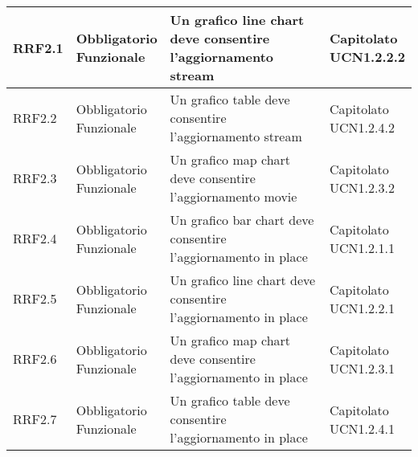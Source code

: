 \begin{longtabu}[c]{|X[0.7,l]|X[l]|X[2.5,l]|X[l]|}
                RRF2.1 & 
                \parbox[t]{4cm}{ Obbligatorio \\ Funzionale} & Un grafico line chart deve consentire l'aggiornamento stream & \parbox[t]{4cm}{Capitolato \\ UCN1.2.2.2 }  \\ 
                \hline
                
                RRF2.2 & 
                \parbox[t]{4cm}{ Obbligatorio \\ Funzionale} & Un grafico table deve consentire l'aggiornamento stream & \parbox[t]{4cm}{Capitolato \\ UCN1.2.4.2 }  \\ 
                \hline
                
                RRF2.3 & 
                \parbox[t]{4cm}{ Obbligatorio \\ Funzionale} & Un grafico map chart deve consentire l'aggiornamento movie & \parbox[t]{4cm}{Capitolato \\ UCN1.2.3.2 }  \\ 
                \hline
                
                RRF2.4 & 
                \parbox[t]{4cm}{ Obbligatorio \\ Funzionale} & Un grafico bar chart deve consentire l'aggiornamento in place & \parbox[t]{4cm}{Capitolato \\ UCN1.2.1.1 }  \\ 
                \hline
                
                RRF2.5 & 
                \parbox[t]{4cm}{ Obbligatorio \\ Funzionale} & Un grafico line chart deve consentire l'aggiornamento in place & \parbox[t]{4cm}{Capitolato \\ UCN1.2.2.1 }  \\ 
                \hline
                
                RRF2.6 & 
                \parbox[t]{4cm}{ Obbligatorio \\ Funzionale} & Un grafico map chart deve consentire l'aggiornamento in place & \parbox[t]{4cm}{Capitolato \\ UCN1.2.3.1 }  \\ 
                \hline
                
                RRF2.7 & 
                \parbox[t]{4cm}{ Obbligatorio \\ Funzionale} & Un grafico table deve consentire l'aggiornamento in place & \parbox[t]{4cm}{Capitolato \\ UCN1.2.4.1 }  \\ 
                \hline
                

\end{longtabu}
